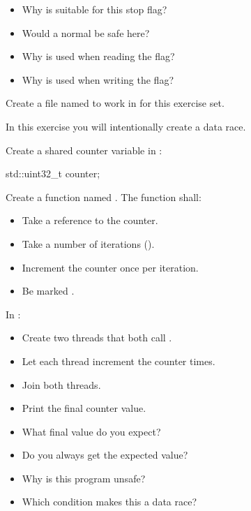 \begin{itemize}
  \item Why is  suitable for this stop flag?
  \item Would a normal  be safe here?
  \item Why is  used when reading the flag?
  \item Why is  used when writing the flag?
\end{itemize}

\label{c6:set:2}
Create a file named  to work in for this exercise set.

\label{c6:ex:2.1}
In this exercise you will intentionally create a data race.

Create a shared counter variable in :

\begin{cppcode}
std::uint32_t counter{};
\end{cppcode}

\noindent Create a function named . The function shall:
\begin{itemize}
  \item Take a reference to the counter.
  \item Take a number of iterations ().
  \item Increment the counter once per iteration.
  \item Be marked .
\end{itemize}
In :
\begin{itemize}
  \item Create two threads that both call .
  \item Let each thread increment the counter  times.
  \item Join both threads.
  \item Print the final counter value.
\end{itemize}

\begin{itemize}
  \item What final value do you expect?
  \item Do you always get the expected value?
  \item Why is this program unsafe?
  \item Which condition makes this a data race?
\end{itemize}

